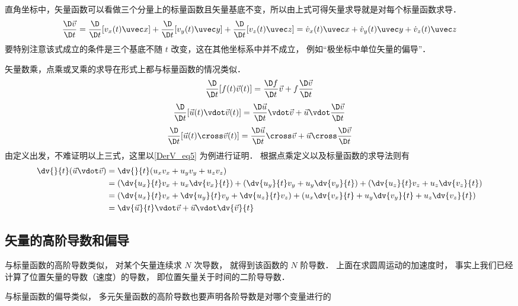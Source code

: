 直角坐标中，矢量函数可以看做三个分量上的标量函数且矢量基底不变，所以由上式可得矢量求导就是对每个标量函数求导．
\begin{equation}
\frac{{\D\vec v}}{{\D t}} = \frac{\D}{{\D t}}[{v_x}(t)\uvec x] + \frac{\D}{{\D t}}[{v_y(t)}\uvec y] + \frac{\D}{{\D t}}[{v_z(t)}\uvec z]
= {\dot v_x}(t)\uvec x + {\dot v_y(t)}\uvec y + {\dot v_z(t)}\uvec z
\end{equation}
要特别注意该式成立的条件是三个基底不随 $t$ 改变，这在其他坐标系中并不成立， 例如“极坐标中单位矢量的偏导”．


矢量数乘，点乘或叉乘的求导在形式上都与标量函数的情况类似．
\begin{equation}
\frac{\D}{{\D t}}[f(t)\vec v(t)] = \frac{{\D f}}{{\D t}}\vec v + f\frac{{\D\vec v}}{{\D t}}
\end{equation}
\begin{equation}\label{DerV_eq5}
\frac{\D}{{\D t}}[\vec u(t)\vdot\vec v(t)] = \frac{{\D\vec u}}{{\D t}}\vdot\vec v + \vec u\vdot\frac{{\D\vec v}}{{\D t}}
\end{equation}
\begin{equation}
\frac{\D}{{\D t}}[\vec u(t) \cross \vec v(t)] = \frac{{\D\vec u}}{{\D t}} \cross \vec v + \vec u \cross \frac{{\D\vec v}}{{\D t}}
\end{equation}
由定义出发，不难证明以上三式，这里以\autoref{DerV_eq5} 为例进行证明． 根据点乘定义以及标量函数的求导法则有
\begin{equation}\begin{aligned}
\dv{}{t} (\vec u \vdot \vec v) &= \dv{}{t} (u_x v_x + u_y v_y + u_z v_z)\\
&= \left(\dv{u_x}{t} v_x +
 u_x \dv{v_x}{t}\right) + \left(\dv{u_y}{t} v_y + u_y \dv{v_y}{t}\right) + \left(\dv{u_z}{t} v_z   + u_z \dv{v_z}{t}\right) \\
&= \left(\dv{u_x}{t} v_x + \dv{u_y}{t} v_y + \dv{u_z}{t} v_z\right) + \left(u_x \dv{v_x}{t} + u_y \dv{v_y}{t} + u_z \dv{v_z}{t}\right) \\
&= \dv{\vec u}{t}\vdot \vec v + \vec u\vdot \dv{\vec v}{t}
\end{aligned}\end{equation}


\subsection{矢量的高阶导数和偏导}
与标量函数的高阶导数类似， 对某个矢量连续求 $N$ 次导数， 就得到该函数的 $N$ 阶导数． 上面在求圆周运动的加速度时， 事实上我们已经计算了位置矢量的导数（速度）的导数， 即位置矢量关于时间的二阶导导数．

与标量函数的偏导类似， 多元矢量函数的高阶导数也要声明各阶导数是对哪个变量进行的


